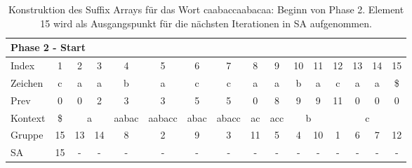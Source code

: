 \begin{table}[H]
\centering
\begin{adjustbox}{max width=\textwidth}
\centering
\begin{tabular}{lccccccccccccccc}
\multicolumn{16}{l}{Phase 2 - Start}                                                                                                                                                                                                                                                                                  \\ \hline
\multicolumn{1}{l|}{Index}   & 1                       & 2  & 3                       & 4                          & 5                           & 6                         & 7                          & 8                       & 9                        & 10 & 11                      & 12  & 13  & 14  & 15  \\
\multicolumn{1}{l|}{Zeichen} & c                       & a  & a                       & b                          & a                           & c                         & c                          & a                       & a                        & b  & a                       & c   & a   & a   & \$  \\
\multicolumn{1}{l|}{Prev}    & 0                       & 0  & 2                       & 3                          & 3                           & 5                         & 5                          & 0                       & 8                        & 9  & 9                       & 11  & 0   & 0   & 0   \\ \hline
\multicolumn{1}{l|}{Kontext} & \multicolumn{1}{c|}{\$} & \multicolumn{2}{c|}{a}       & \multicolumn{1}{c|}{aabac} & \multicolumn{1}{c|}{aabacc} & \multicolumn{1}{c|}{abac} & \multicolumn{1}{c|}{abacc} & \multicolumn{1}{c|}{ac} & \multicolumn{1}{c|}{acc} & \multicolumn{2}{c|}{b}       & \multicolumn{4}{c}{c} \\
\multicolumn{1}{l|}{Gruppe}  & \multicolumn{1}{c|}{15} & 13 & \multicolumn{1}{c|}{14} & \multicolumn{1}{c|}{8}     & \multicolumn{1}{c|}{2}      & \multicolumn{1}{c|}{9}    & \multicolumn{1}{c|}{3}     & \multicolumn{1}{c|}{11} & \multicolumn{1}{c|}{5}   & 4  & \multicolumn{1}{c|}{10} & 1   & 6   & 7   & 12  \\
\multicolumn{1}{l|}{SA}      & \multicolumn{1}{c|}{15} & -  & \multicolumn{1}{c|}{-}  & \multicolumn{1}{c|}{-}     & \multicolumn{1}{c|}{-}      & \multicolumn{1}{c|}{-}    & \multicolumn{1}{c|}{-}     & \multicolumn{1}{c|}{-}  & \multicolumn{1}{c|}{-}   & -  & \multicolumn{1}{c|}{-}  & -   & -   & -   & -  
\end{tabular}
\end{adjustbox}

\caption[Konstruktion des Suffix Arrays für das Wort caabaccaabacaa: Beginn von Phase 2]{Konstruktion des Suffix Arrays für das Wort caabaccaabacaa: Beginn von Phase 2. Element 15 wird als Ausgangspunkt für die nächsten Iterationen in SA aufgenommen.}
\label{table_complex_example_2_start} 
\end{table}


